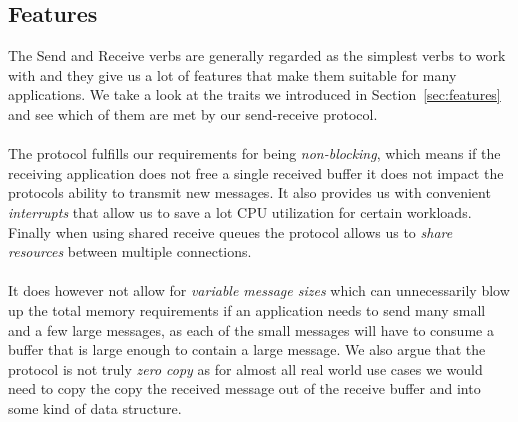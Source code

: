 \subsection{Features}

The Send and Receive verbs are generally regarded as the simplest verbs to work with and they give us a lot of features
that make them suitable for many applications. We take a look at the traits we introduced in Section~\ref{sec:features} 
and see which of them are met by our send-receive protocol.

\paragraph{} The protocol fulfills our requirements for being \emph{non-blocking}, which means if the receiving application does not free a single
received buffer it does not impact the protocols ability to transmit new messages.
It also provides us with convenient \emph{interrupts} that allow us to save a lot CPU utilization for certain workloads.
Finally when using shared receive queues the protocol allows us to \emph{share resources} between multiple connections.

\paragraph{} It does however not allow for \emph{variable message sizes} which can unnecessarily blow up the total memory
requirements if an application needs to send many small and a few large messages, as each of the small messages will have
to consume a buffer that is large enough to contain a large message. We also argue that the protocol is not truly 
\emph{zero copy} as for almost all real world use cases we would need to copy the copy the received message out of the
receive buffer and into some kind of data structure.

